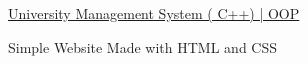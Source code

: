 \begin{cventries}
        \cventry
    {} %
    {\href{https://github.com/shafeenyousafzaii/University-Management-System-with-C-}{University Management System ( C++) | OOP }   } %
    {} %
    {} %
    {   \begin{cvitems} %
      \item {Simple Website Made with HTML and CSS}
    \end{cvitems}
      }

\end{cventries}
